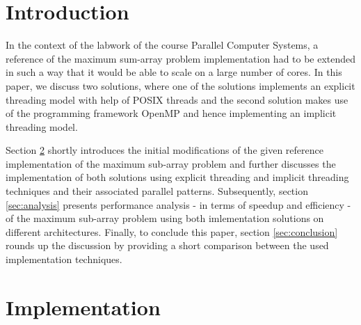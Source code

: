 \documentclass[conference]{IEEEtran}
\begin{document}





%
\IEEEpeerreviewmaketitle



\section{Introduction}
In the context of the labwork of the course Parallel Computer Systems, a reference of the maximum sum-array problem implementation had to be extended in such a way that it would be able to scale on a large number of cores. In this paper, we discuss two solutions, where one of the solutions implements an explicit threading model with help of POSIX threads and the second solution makes use of the programming framework OpenMP and hence implementing an implicit threading model. 

Section \ref{sec:impl} shortly introduces the initial modifications of the given reference implementation of the maximum sub-array problem and further discusses the implementation of both solutions using explicit threading and implicit threading techniques and their associated parallel patterns. Subsequently, section \ref{sec:analysis} presents performance analysis - in terms of speedup and efficiency - of the maximum sub-array problem using both imlementation solutions on different architectures. Finally, to conclude this paper, section \ref{sec:conclusion} rounds up the discussion by providing a short comparison between the used implementation techniques. 

\section{Implementation}
\label{sec:impl}
\end{document}
